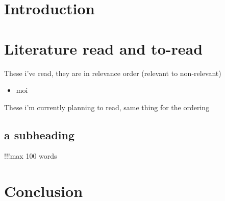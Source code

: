 \chapter{Introduction}

\chapter{Literature read and to-read}

These i've read, they are in relevance order (relevant to non-relevant)

\begin{itemize}
\item moi \cite{edgelatency}
\end{itemize}

These i'm currently planning to read, same thing for the ordering

\section{a subheading}
!!!max 100 words

\chapter{Conclusion}

